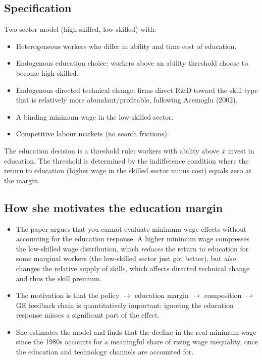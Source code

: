 \documentclass[12pt]{article}
\begin{document}
\subsection*{Specification}

Two-sector model (high-skilled, low-skilled) with:
\begin{itemize}
    \item Heterogeneous workers who differ in ability and time cost of education.
    \item Endogenous education choice: workers above an ability threshold choose to become high-skilled.
    \item Endogenous directed technical change: firms direct R\&D toward the skill type that is relatively more abundant/profitable, following Acemoglu (2002).
    \item A binding minimum wage in the low-skilled sector.
    \item Competitive labour markets (no search frictions).
\end{itemize}

The education decision is a threshold rule: workers with ability above $\bar{x}$ invest in education. The threshold is determined by the indifference condition where the return to education (higher wage in the skilled sector minus cost) equals zero at the margin.

\subsection*{How she motivates the education margin}

\begin{itemize}
    \item The paper argues that you cannot evaluate minimum wage effects without accounting for the education response. A higher minimum wage compresses the low-skilled wage distribution, which \emph{reduces} the return to education for some marginal workers (the low-skilled sector just got better), but \emph{also} changes the relative supply of skills, which affects directed technical change and thus the skill premium.
    \item The motivation is that the policy $\to$ education margin $\to$ composition $\to$ GE feedback chain is quantitatively important: ignoring the education response misses a significant part of the effect.
    \item She estimates the model and finds that the decline in the real minimum wage since the 1980s accounts for a meaningful share of rising wage inequality, once the education and technology channels are accounted for.
\end{itemize}
\end{document}
